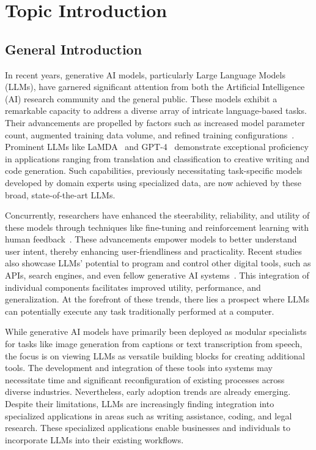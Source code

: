 \documentclass[a4paper,oneside]{book}
\begin{document}
\newpage
\tableofcontents

\newpage
\listoffigures

\newpage
\listoftables

\newpage
\chapter{Topic Introduction}

\section{General Introduction}
In recent years, generative AI models, particularly Large Language Models (LLMs), have garnered significant attention from both the Artificial Intelligence (AI) research community and the general public. These models exhibit a remarkable capacity to address a diverse array of intricate language-based tasks. Their advancements are propelled by factors such as increased model parameter count, augmented training data volume, and refined training configurations~\cite{brown2020language, radford2019language, hernandez2021scaling, kaplan2020scaling}. Prominent LLMs like LaMDA~\cite{thoppilan2022lamda} and GPT-4~\cite{openai2023gpt4} demonstrate exceptional proficiency in applications ranging from translation and classification to creative writing and code generation. Such capabilities, previously necessitating task-specific models developed by domain experts using specialized data, are now achieved by these broad, state-of-the-art LLMs.

Concurrently, researchers have enhanced the steerability, reliability, and utility of these models through techniques like fine-tuning and reinforcement learning with human feedback~\cite{ouyang2022training, bai2022training}. These advancements empower models to better understand user intent, thereby enhancing user-friendliness and practicality. Recent studies also showcase LLMs' potential to program and control other digital tools, such as APIs, search engines, and even fellow generative AI systems~\cite{schick2023toolformer, mialon2023augmented}. This integration of individual components facilitates improved utility, performance, and generalization. At the forefront of these trends, there lies a prospect where LLMs can potentially execute any task traditionally performed at a computer.

While generative AI models have primarily been deployed as modular specialists for tasks like image generation from captions or text transcription from speech, the focus is on viewing LLMs as versatile building blocks for creating additional tools. The development and integration of these tools into systems may necessitate time and significant reconfiguration of existing processes across diverse industries. Nevertheless, early adoption trends are already emerging. Despite their limitations, LLMs are increasingly finding integration into specialized applications in areas such as writing assistance, coding, and legal research. These specialized applications enable businesses and individuals to incorporate LLMs into their existing workflows.
\end{document}
